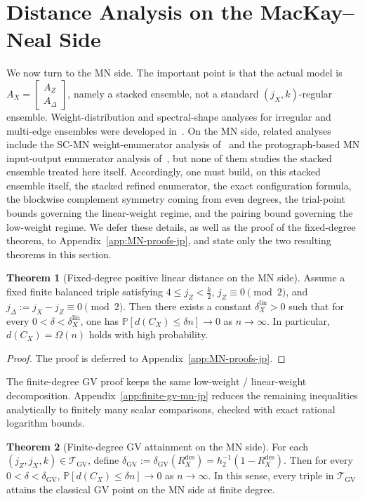 \documentclass[11pt]{article}
\theoremstyle{definition}
\newtheorem{theorem}{Theorem}[section]
\newcommand{\PP}{\mathbb P}
\newcommand{\h}{h_2}
\newcommand{\CX}{C_X}
\begin{document}
\section{Distance Analysis on the MacKay--Neal Side}

We now turn to the MN side.
The important point is that the actual model is
\(A_X=\begin{bmatrix}A_Z\\ A_\Delta\end{bmatrix}\),
namely a stacked ensemble, not a standard \((j_X,k)\)-regular ensemble.
Weight-distribution and spectral-shape analyses for irregular and multi-edge ensembles were developed in~\cite{DIRU06,KasaiMET10}. On the MN side, related analyses include the SC-MN weight-enumerator analysis of~\cite{Mitchell12} and the protograph-based MN input-output enumerator analysis of~\cite{Zahr25}, but none of them studies the stacked ensemble treated here itself.
Accordingly, one must build, on this stacked ensemble itself, the stacked refined enumerator, the exact configuration formula, the blockwise complement symmetry coming from even degrees, the trial-point bounds governing the linear-weight regime, and the pairing bound governing the low-weight regime. We defer these details, as well as the proof of the fixed-degree theorem, to Appendix~\ref{app:MN-proofs-jp}, and state only the two resulting theorems in this section.

\begin{theorem}[Fixed-degree positive linear distance on the MN side]\label{thm:MN-lin-jp}
Assume a fixed finite balanced triple satisfying \(4\le j_Z<\frac{k}{2}\), \(j_Z\equiv 0\pmod 2\), and \(j_\Delta:=j_X-j_Z\equiv 0\pmod 2\). Then there exists a constant \(\delta_X^{\mathrm{lin}}>0\) such that for every \(0<\delta<\delta_X^{\mathrm{lin}}\), one has \(\PP[d(\CX)\le \delta n]\to 0\) as \(n\to\infty\).
In particular, \(d(\CX)=\Omega(n)\) holds with high probability.
\end{theorem}

\begin{proof}
The proof is deferred to Appendix~\ref{app:MN-proofs-jp}.
\end{proof}

The finite-degree GV proof keeps the same low-weight / linear-weight decomposition. Appendix~\ref{app:finite-gv-mn-jp} reduces the remaining inequalities analytically to finitely many scalar comparisons, checked with exact rational logarithm bounds.

\begin{theorem}[Finite-degree GV attainment on the MN side]\label{thm:MN-gv-jp}
For each \((j_Z,j_X,k)\in\mathcal T_{\mathrm{GV}}\), define \(\delta_{\mathrm{GV}}:=\delta_{\mathrm{GV}}(R_X^{\mathrm{des}})=\h^{-1}(1-R_X^{\mathrm{des}})\). Then for every \(0<\delta<\delta_{\mathrm{GV}}\), \(\PP[d(\CX)\le \delta n]\to 0\) as \(n\to\infty\). In this sense, every triple in \(\mathcal T_{\mathrm{GV}}\) attains the classical GV point on the MN side at finite degree.
\end{theorem}
\end{document}
